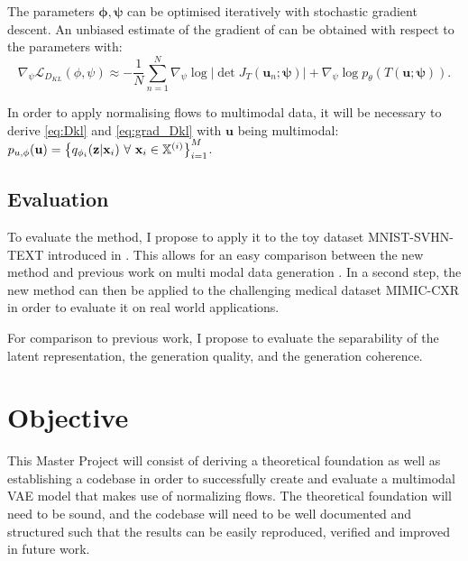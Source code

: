 \documentclass[english]{scrartcl}
\begin{document}
    The parameters $\boldsymbol{\phi}, \boldsymbol{\psi}$ can be optimised iteratively with stochastic gradient descent.
    An unbiased estimate of the gradient of  can be obtained with respect to the parameters with:
    \begin{equation}\label{eq:grad_Dkl}
        \nabla _{\psi} \mathcal{L}_{D_{KL}}(\phi, \psi) \approx - \frac{1}{N} \sum ^N _{n=1}   \nabla _{\psi}\log |\det J_{T}(\textbf{u}_n; \boldsymbol{\psi})| + \nabla _{\psi} \log p_{\theta}(T(\textbf{u}; \boldsymbol{\psi})).
    \end{equation}
    
    In order to apply normalising flows to multimodal data, it will be necessary to derive \cref{eq:Dkl} and \cref{eq:grad_Dkl} with $\textbf{u}$ being multimodal: $p_{u,\phi}(\textbf{u}) = \left\{ q_{\phi _i}(\textbf{z}|\textbf{x}_i)\ \forall\ \textbf{x}_i \in \mathbb{X}^{(i)} \right\}_{i=1}^M$.

    \subsection{Evaluation}
    To evaluate the method, I propose to apply it to the toy dataset MNIST-SVHN-TEXT introduced in \citet{sutter_generalized_2020}.
    This allows for an easy comparison between the new method and previous work on multi modal data generation \citep[MoPoE, MoE, PoE][]{sutter_generalized_2020, shi_variational_2019, poe}.
    In a second step, the new method can then be applied to the challenging medical dataset MIMIC-CXR \citep{johnson_mimic-cxr-jpg_2019} in order to evaluate it on real world applications.

    For comparison to previous work, I propose to evaluate the separability of the latent representation, the generation quality, and the generation coherence.


    \section{Objective}
    This Master Project will consist of deriving a theoretical foundation as well as establishing a codebase in order to successfully create and evaluate a multimodal VAE model that makes use of normalizing flows.
    The theoretical foundation will need to be sound, and the codebase will need to be well documented and structured such that the results can be easily reproduced, verified and improved in future work.

    \newpage
    \printbibliography
\end{document}
